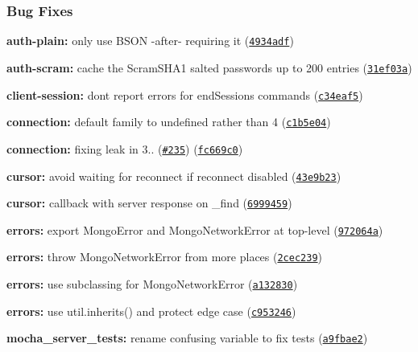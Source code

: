 \subsubsection*{Bug Fixes}


\begin{DoxyItemize}
\item {\bfseries auth-\/plain\+:} only use B\+S\+ON -\/after-\/ requiring it (\href{https://github.com/christkv/mongodb-core/commit/4934adf}{\tt 4934adf})
\item {\bfseries auth-\/scram\+:} cache the Scram\+S\+H\+A1 salted passwords up to 200 entries (\href{https://github.com/christkv/mongodb-core/commit/31ef03a}{\tt 31ef03a})
\item {\bfseries client-\/session\+:} don\textquotesingle{}t report errors for end\+Sessions commands (\href{https://github.com/christkv/mongodb-core/commit/c34eaf5}{\tt c34eaf5})
\item {\bfseries connection\+:} default {\ttfamily family} to undefined rather than 4 (\href{https://github.com/christkv/mongodb-core/commit/c1b5e04}{\tt c1b5e04})
\item {\bfseries connection\+:} fixing leak in 3.. (\href{https://github.com/christkv/mongodb-core/issues/235}{\tt \#235}) (\href{https://github.com/christkv/mongodb-core/commit/fc669c0}{\tt fc669c0})
\item {\bfseries cursor\+:} avoid waiting for reconnect if reconnect disabled (\href{https://github.com/christkv/mongodb-core/commit/43e9b23}{\tt 43e9b23})
\item {\bfseries cursor\+:} callback with server response on {\ttfamily \+\_\+find} (\href{https://github.com/christkv/mongodb-core/commit/6999459}{\tt 6999459})
\item {\bfseries errors\+:} export Mongo\+Error and Mongo\+Network\+Error at top-\/level (\href{https://github.com/christkv/mongodb-core/commit/972064a}{\tt 972064a})
\item {\bfseries errors\+:} throw Mongo\+Network\+Error from more places (\href{https://github.com/christkv/mongodb-core/commit/2cec239}{\tt 2cec239})
\item {\bfseries errors\+:} use subclassing for Mongo\+Network\+Error (\href{https://github.com/christkv/mongodb-core/commit/a132830}{\tt a132830})
\item {\bfseries errors\+:} use util.\+inherits() and protect edge case (\href{https://github.com/christkv/mongodb-core/commit/c953246}{\tt c953246})
\item {\bfseries mocha\+\_\+server\+\_\+tests\+:} rename confusing variable to fix tests (\href{https://github.com/christkv/mongodb-core/commit/a9fbae2}{\tt a9fbae2})

\end{DoxyItemize}
